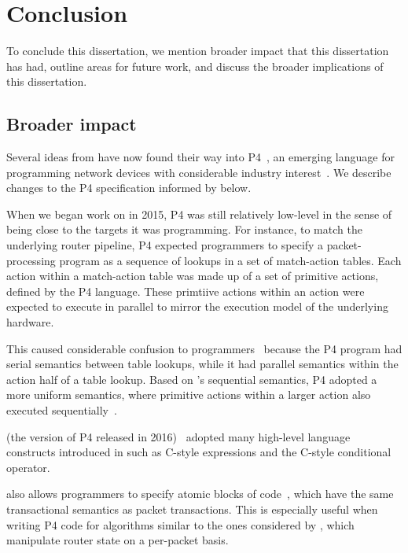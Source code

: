 \chapter{Conclusion}
\label{chap:concl}

To conclude this dissertation, we mention broader impact that this dissertation
has had, outline areas for future work, and discuss the broader implications of
this dissertation.

\section{Broader impact}
\label{s:impact}
Several ideas from \pktlanguage have now found their way into P4~\cite{p4}, an
emerging language for programming network devices with considerable industry
interest~\cite{p4org}. We describe changes to the P4 specification informed by
\pktlanguage below.
\begin{CompactEnumerate}
\item When we began work on \pktlanguage in 2015, P4 was still relatively
low-level in the sense of being close to the targets it was programming. For
instance, to match the underlying router pipeline, P4 expected programmers to
specify a packet-processing program as a sequence of lookups in a set of
match-action tables. Each action within a match-action table was made up of a
set of primitive actions, defined by the P4 language. These primtiive actions
within an action were expected to execute in parallel to mirror the execution
model of the underlying hardware.

This caused considerable confusion to programmers~\cite{p4-semantics} because
the P4 program had serial semantics between table lookups, while it had
parallel semantics within the action half of a table lookup. Based on
\pktlanguage's sequential semantics, P4 adopted a more uniform semantics, where
primitive actions within a larger action also executed
sequentially~\cite{p4_sequential_pr, p4_sequential_issue}.

\item \pfs (the version of P4 released in 2016)~\cite{p4_16} adopted many
high-level language constructs introduced in \pktlanguage such as C-style
expressions and the C-style conditional operator.

\item \pfs also allows programmers to specify atomic blocks of
code~\cite{p4_atomic_pr, p4_atomic_issue}, which have the same transactional
semantics as packet transactions. This is especially useful when writing P4
code for algorithms similar to the ones considered by \pktlanguage, which
manipulate router state on a per-packet basis.
\end{CompactEnumerate}

